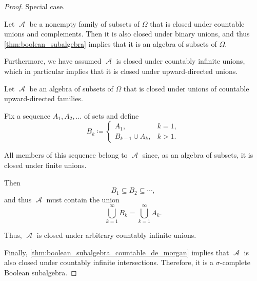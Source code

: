 \begin{proof}
   Special case.

   Let \( \mscrA \) be a nonempty family of subsets of \( \Omega \) that is closed under countable unions and complements. Then it is also closed under binary unions, and thus \cref{thm:boolean_subalgebra} implies that it is an algebra of subsets of \( \Omega \).

  Furthermore, we have assumed \( \mscrA \) is closed under countably infinite unions, which in particular implies that it is closed under upward-directed unions.

   Let \( \mscrA \) be an algebra of subsets of \( \Omega \) that is closed under unions of countable upward-directed families.

  Fix a sequence \( A_1, A_2, \ldots \) of sets and define
  \begin{equation*}
    B_k \coloneqq \begin{cases}
      A_1,              &k = 1, \\
      B_{k-1} \cup A_k, &k > 1.
    \end{cases}
  \end{equation*}

  All members of this sequence belong to \( \mscrA \) since, as an algebra of subsets, it is closed under finite unions.

  Then
  \begin{equation*}
    B_1 \subseteq B_2 \subseteq \cdots,
  \end{equation*}
  and thus \( \mscrA \) must contain the union
  \begin{equation*}
    \bigcup_{k=1}^\infty B_k = \bigcup_{k=1}^\infty A_k.
  \end{equation*}

  Thus, \( \mscrA \) is closed under arbitrary countably infinite unions.

  Finally, \cref{thm:boolean_subalgebra_countable_de_morgan} implies that \( \mscrA \) is also closed under countably infinite intersections. Therefore, it is a \( \sigma \)-complete Boolean subalgebra.
\end{proof}

